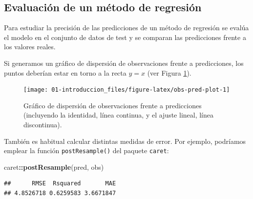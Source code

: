 \documentclass[
  spanish,
]{book}
\newenvironment{Shaded}{\begin{snugshade}}{\end{snugshade}}
\newcommand{\DataTypeTok}[1]{\textcolor[rgb]{0.13,0.29,0.53}{#1}}
\newcommand{\KeywordTok}[1]{\textcolor[rgb]{0.13,0.29,0.53}{\textbf{#1}}}
\newcommand{\NormalTok}[1]{#1}
\newcommand{\OperatorTok}[1]{\textcolor[rgb]{0.81,0.36,0.00}{\textbf{#1}}}
\newcommand{\StringTok}[1]{\textcolor[rgb]{0.31,0.60,0.02}{#1}}
\theoremstyle{break}
\theoremstyle{definition}
\theoremstyle{definition}
\theoremstyle{definition}
\theoremstyle{remark}
\begin{document}
\hypertarget{eval-reg}{%
\subsection{Evaluación de un método de regresión}\label{eval-reg}}

Para estudiar la precisión de las predicciones de un método de regresión se evalúa el
modelo en el conjunto de datos de test y se comparan las predicciones frente a los valores reales.

Si generamos un gráfico de dispersión de observaciones frente a predicciones, los puntos deberían estar en torno a la recta \(y=x\) (ver Figura \ref{fig:obs-pred-plot}).

\begin{Shaded}
\end{Shaded}

\begin{figure}[!htb]

{\centering \texttt{[image: 01-introduccion\_files/figure-latex/obs-pred-plot-1]} 

}

\caption{Gráfico de dispersión de observaciones frente a predicciones (incluyendo la identidad, línea continua, y el ajuste lineal, línea discontinua).}\label{fig:obs-pred-plot}
\end{figure}

También es habitual calcular distintas medidas de error.
Por ejemplo, podríamos emplear la función \texttt{postResample()} del paquete \texttt{caret}:

\begin{Shaded}
\begin{Highlighting}[]
\NormalTok{caret}\OperatorTok{::}\KeywordTok{postResample}\NormalTok{(pred, obs)}
\end{Highlighting}
\end{Shaded}

\begin{verbatim}
##      RMSE  Rsquared       MAE 
## 4.8526718 0.6259583 3.6671847
\end{verbatim}
\end{document}

